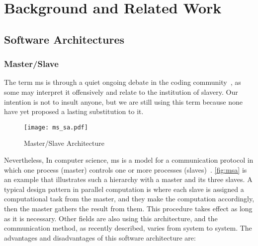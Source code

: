 
\chapter{Background and Related Work}\label{ch:background}\glsresetall

\section{Software Architectures}

\subsection{Master/Slave}
The term \ac{ms} is through a quiet ongoing debate in the coding community~\cite{giz_master, reg_master, med_master}, as some may interpret it offensively and relate to the institution of slavery. Our intention is not to insult anyone, but we are still using this term because none have yet proposed a lasting substitution to it.

\begin{figure}
    \centering
    \texttt{[image: ms\_sa.pdf]}
    \caption{Master/Slave Architecture}
    \label{fig:msa}
\end{figure}

Nevertheless, In computer science, \ac{ms} is a model for a communication protocol in which one process (master) controls one or more processes (slaves)~\cite{ms_bs}. \autoref{fig:msa} is an example that illustrates such a hierarchy with a master and its three slaves. A typical design pattern in parallel computation is where each slave is assigned a computational task from the master, and they make the computation accordingly, then the master gathers the result from them. This procedure takes effect as long as it is necessary. Other fields are also using this architecture, and the communication method, as recently described, varies from system to system. The advantages and disadvantages of this software architecture are:

